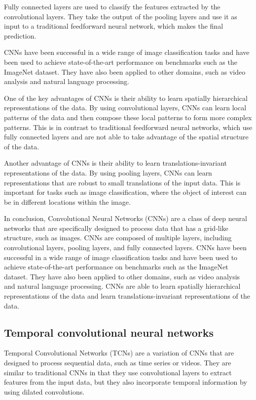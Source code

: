 Fully connected layers are used to classify the features extracted by the convolutional layers.
They take the output of the pooling layers and use it as input to a traditional feedforward neural network, which makes the final prediction.

CNNs have been successful in a wide range of image classification tasks and have been used to achieve state-of-the-art performance on benchmarks such as the ImageNet dataset.
They have also been applied to other domains, such as video analysis and natural language processing.

One of the key advantages of CNNs is their ability to learn spatially hierarchical representations of the data.
By using convolutional layers, CNNs can learn local patterns of the data and then compose these local patterns to form more complex patterns.
This is in contrast to traditional feedforward neural networks, which use fully connected layers and are not able to take advantage of the spatial structure of the data.

Another advantage of CNNs is their ability to learn translations-invariant representations of the data.
By using pooling layers, CNNs can learn representations that are robust to small translations of the input data.
This is important for tasks such as image classification, where the object of interest can be in different locations within the image.

In conclusion, Convolutional Neural Networks (CNNs) are a class of deep neural networks that are specifically designed to process data that has a grid-like structure, such as images.
CNNs are composed of multiple layers, including convolutional layers, pooling layers, and fully connected layers.
CNNs have been successful in a wide range of image classification tasks and have been used to achieve state-of-the-art performance on benchmarks such as the ImageNet dataset.
They have also been applied to other domains, such as video analysis and natural language processing.
CNNs are able to learn spatially hierarchical representations of the data and learn translations-invariant representations of the data.

\subsection{Temporal convolutional neural networks}

Temporal Convolutional Networks (TCNs) are a variation of CNNs that are designed to process sequential data, such as time series or videos.
They are similar to traditional CNNs in that they use convolutional layers to extract features from the input data, but they also incorporate temporal information by using dilated convolutions.

